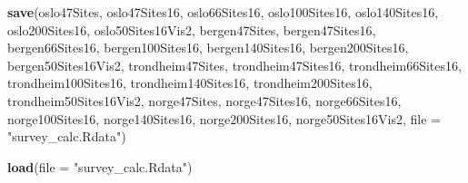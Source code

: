 \documentclass[]{article}
\newenvironment{Shaded}{\begin{snugshade}}{\end{snugshade}}
\newcommand{\KeywordTok}[1]{\textcolor[rgb]{0.13,0.29,0.53}{\textbf{#1}}}
\newcommand{\DataTypeTok}[1]{\textcolor[rgb]{0.13,0.29,0.53}{#1}}
\newcommand{\StringTok}[1]{\textcolor[rgb]{0.31,0.60,0.02}{#1}}
\newcommand{\NormalTok}[1]{#1}
\begin{document}
\begin{Shaded}
\begin{Highlighting}[]
\KeywordTok{save}\NormalTok{(oslo47Sites, oslo47Sites16, oslo66Sites16, oslo100Sites16, oslo140Sites16, }
\NormalTok{    oslo200Sites16, oslo50Sites16Vis2, bergen47Sites, bergen47Sites16, bergen66Sites16, }
\NormalTok{    bergen100Sites16, bergen140Sites16, bergen200Sites16, bergen50Sites16Vis2, }
\NormalTok{    trondheim47Sites, trondheim47Sites16, trondheim66Sites16, trondheim100Sites16, }
\NormalTok{    trondheim140Sites16, trondheim200Sites16, trondheim50Sites16Vis2, norge47Sites, }
\NormalTok{    norge47Sites16, norge66Sites16, norge100Sites16, norge140Sites16, norge200Sites16, }
\NormalTok{    norge50Sites16Vis2, }\DataTypeTok{file =} \StringTok{"survey_calc.Rdata"}\NormalTok{)}
\end{Highlighting}
\end{Shaded}

\begin{Shaded}
\begin{Highlighting}[]
\KeywordTok{load}\NormalTok{(}\DataTypeTok{file =} \StringTok{"survey_calc.Rdata"}\NormalTok{)}
\end{Highlighting}
\end{Shaded}
\end{document}
